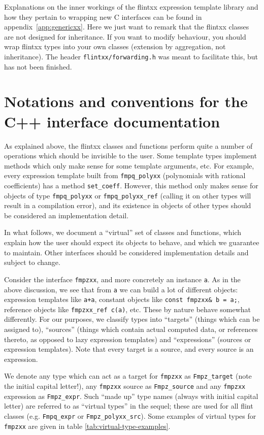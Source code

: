 \documentclass[a4paper,10pt]{book}
\newcommand{\code}{\lstinline}
\begin{document}
{{Explanations on the inner workings of the flintxx expression template library
and how they pertain to wrapping new C interfaces can be found in
appendix~\ref{app:genericxx}. Here we just want to remark that the flintxx
classes are not designed for inheritance. If you want to modify behaviour, you
should wrap flintxx types into your own classes (extension by aggregation, not
inheritance). The header \code{flintxx/forwarding.h} was meant to facilitate
this, but has not been finished.

\section{Notations and conventions for the C++ interface documentation}
As explained above, the flintxx classes and functions perform quite a number of
operations which should be invisible to the user. Some template types implement
methods which only make sense for some template arguments, etc. For example,
every expression template built from \code{fmpq_polyxx} (polynomials with
rational coefficients) has a method \code{set_coeff}. However, this method only
makes sense for objects of type \code{fmpq_polyxx} or \code{fmpq_polyxx_ref}
(calling it on other types will result in a compilation error),
and its existence in objects of other types should be considered an
implementation detail.

In what follows,
we document a ``virtual'' set of classes and functions, which explain how the
user should expect its objects to behave, and which we guarantee to maintain.
Other interfaces should be considered implementation details and subject to
change.

Consider the interface \code{fmpzxx}, and more concretely an instance \code{a}.
As in the above discussion, we see that from \code{a} we can build a lot of
different objects: expression templates like \code{a+a}, constant objects like
\code{const fmpzxx& b = a;}, reference objects like \code{fmpzxx_ref c(a)}, etc.
These by nature behave somewhat differently. For our purposes, we classify types
into ``targets'' (things which can be assigned to), ``sources'' (things which
contain actual computed data, or references thereto,
as opposed to lazy expression templates) and
``expressions'' (sources or expression templates). Note that every target is a
source, and every source is an expression.

We denote any type which can
act as a target for \code{fmpzxx} as \code{Fmpz_target} (note the initial
capital letter!), any \code{fmpzxx} source as \code{Fmpz_source} and any
\code{fmpzxx} expression as \code{Fmpz_expr}. Such ``made up'' type names
(always with initial capital letter) are
referred to as ``virtual types'' in the sequel; these are used for all flint
classes (e.g. \code{Fmpq_expr} or \code{Fmpz_polyxx_src}). Some examples of
virtual types for \code{fmpzxx} are given in table
\ref{tab:virtual-type-examples}.

}}
\end{document}
